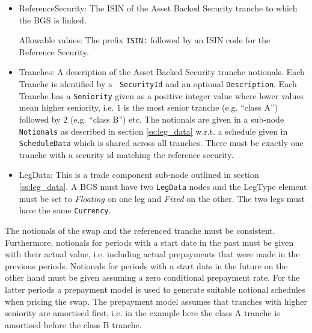 \begin{itemize}

\item ReferenceSecurity: The ISIN of the Asset Backed Security tranche to which the BGS is linked.

Allowable values:  The prefix {\tt ISIN:} followed by an ISIN code for the Reference Security.

\item Tranches: A description of the Asset Backed Security tranche notionals. Each Tranche is identified by a {\tt
    SecurityId} and an optional {\tt Description}. Each Tranche has a {\tt Seniority} given as a positive integer value
  where lower values mean higher seniority, i.e. $1$ is the most senior tranche (e.g. ``class A'') followed by $2$
  (e.g. ``class B'') etc.  The notionals are given in a sub-node {\tt Notionals} as described in section
  \ref{ss:leg_data} w.r.t. a schedule given in {\tt ScheduleData} which is shared across all tranches. There must be
  exactly one tranche with a security id matching the reference security.

\item LegData: This is a trade component sub-node outlined in section \ref{ss:leg_data}. A BGS must have two  \lstinline!LegData! nodes and the LegType element must be set to \emph{Floating} on one leg and \emph{Fixed} on the other. The two legs must have the same \lstinline!Currency!.

\end{itemize}

The notionals of the swap and the referenced tranche must be consistent. Furthermore, notionals for periods with a start
date in the past must be given with their actual value, i.e. including actual prepayments that were made in the previous
periods. Notionals for periods with a start dats in the future on the other hand must be given assuming a zero
conditional prepayment rate. For the latter periods a prepayment model is used to generate suitable notional schedules
when pricing the swap. The prepayment model assumes that tranches with higher seniority are amortised first, i.e. in the
example here the class A tranche is amortised before the class B tranche.

